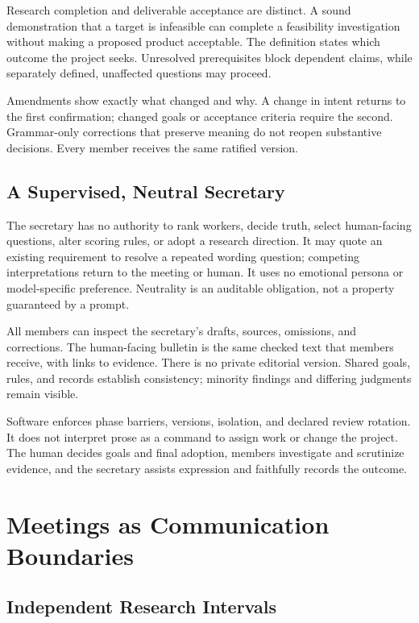 \documentclass[11pt]{article}
\begin{document}
Research completion and deliverable acceptance are distinct. A sound demonstration that a target is infeasible can complete a feasibility investigation without making a proposed product acceptable. The definition states which outcome the project seeks. Unresolved prerequisites block dependent claims, while separately defined, unaffected questions may proceed.

Amendments show exactly what changed and why. A change in intent returns to the first confirmation; changed goals or acceptance criteria require the second. Grammar-only corrections that preserve meaning do not reopen substantive decisions. Every member receives the same ratified version.

\subsection{A Supervised, Neutral Secretary}

The secretary has no authority to rank workers, decide truth, select human-facing questions, alter scoring rules, or adopt a research direction. It may quote an existing requirement to resolve a repeated wording question; competing interpretations return to the meeting or human. It uses no emotional persona or model-specific preference. Neutrality is an auditable obligation, not a property guaranteed by a prompt.

All members can inspect the secretary's drafts, sources, omissions, and corrections. The human-facing bulletin is the same checked text that members receive, with links to evidence. There is no private editorial version. Shared goals, rules, and records establish consistency; minority findings and differing judgments remain visible.

Software enforces phase barriers, versions, isolation, and declared review rotation. It does not interpret prose as a command to assign work or change the project. The human decides goals and final adoption, members investigate and scrutinize evidence, and the secretary assists expression and faithfully records the outcome.

\section{Meetings as Communication Boundaries}

\subsection{Independent Research Intervals}
\end{document}
